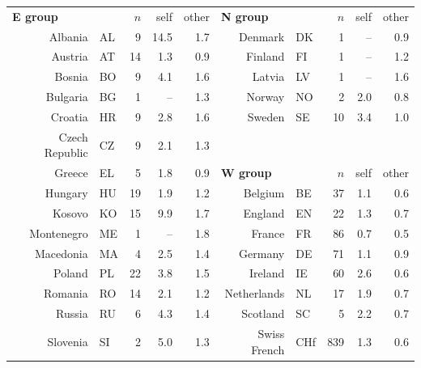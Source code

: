 \documentclass{article}
\begin{document}
\begin{table}[!htp]
\begin{center}
\begin{tabular}{|rlrrr||rlrrr|}
  \hline
\multicolumn{2}{|l}{\bf E group}  & $n$ & self & other & \multicolumn{2}{|l}{\bf N group}  &  $n$& self & other \\ \cline{1-10}
Albania                 &   AL    &   9 & 14.5 & 1.7   & Denmark       &   DK              &   1 &   -- & 0.9   \\
Austria                 &   AT    &  14 &  1.3 & 0.9   & Finland       &   FI              &   1 &   -- & 1.2   \\
Bosnia                  &   BO    &   9 &  4.1 & 1.6   & Latvia        &   LV              &   1 &   -- & 1.6   \\
Bulgaria                &   BG    &   1 &   -- & 1.3   & Norway        &   NO              &   2 &  2.0 & 0.8   \\
Croatia                 &   HR    &   9 &  2.8 & 1.6   & Sweden        &   SE              &  10 &  3.4 & 1.0   \\
Czech Republic          &   CZ    &   9 &  2.1 & 1.3   &               &                   &     &      &       \\ \cline{6-10}
Greece                  &   EL    &   5 &  1.8 & 0.9   & \multicolumn{2}{|l}{\bf W group}  &  $n$& self & other \\ \cline{6-10}
Hungary                 &   HU    &  19 &  1.9 & 1.2   & Belgium       &   BE              &  37 &  1.1 & 0.6   \\
Kosovo                  &   KO    &  15 &  9.9 & 1.7   & England       &   EN              &  22 &  1.3 & 0.7   \\
Montenegro              &   ME    &   1 &   -- & 1.8   & France        &   FR              &  86 &  0.7 & 0.5   \\
Macedonia               &   MA    &   4 &  2.5 & 1.4   & Germany       &   DE              &  71 &  1.1 & 0.9   \\
Poland                  &   PL    &  22 &  3.8 & 1.5   & Ireland       &   IE              &  60 &  2.6 & 0.6   \\
Romania                 &   RO    &  14 &  2.1 & 1.2   & Netherlands   &   NL              &  17 &  1.9 & 0.7   \\
Russia                  &   RU    &   6 &  4.3 & 1.4   & Scotland      &   SC              &   5 &  2.2 & 0.7   \\
Slovenia                &   SI    &   2 &  5.0 & 1.3   & Swiss French  &  CHf              & 839 &  1.3 & 0.6   \\

\end{tabular}
\end{center}
\end{table}
\end{document}
